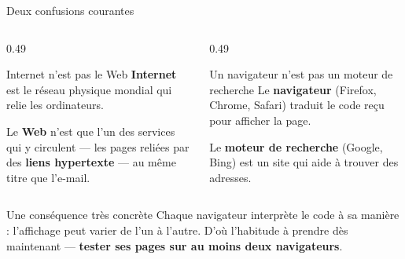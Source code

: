 \documentclass[aspectratio=169,11pt]{beamer}
\begin{document}
\begin{frame}{Deux confusions courantes}
  \begin{columns}[T]
    \begin{column}{0.49\textwidth}
      \begin{alertblock}{Internet n'est pas le Web}
        \textbf{Internet} est le réseau physique mondial qui relie les ordinateurs.
        \vspace{0.15cm}

        Le \textbf{Web} n'est que l'un des services qui y circulent --- les pages reliées par des \textbf{liens hypertexte} --- au même titre que l'e-mail.
      \end{alertblock}
    \end{column}
    \begin{column}{0.49\textwidth}
      \begin{alertblock}{Un navigateur n'est pas un moteur de recherche}
        Le \textbf{navigateur} (Firefox, Chrome, Safari) traduit le code reçu pour afficher la page.
        \vspace{0.15cm}

        Le \textbf{moteur de recherche} (Google, Bing) est un site qui aide à trouver des adresses.
      \end{alertblock}
    \end{column}
  \end{columns}
  \vspace{0.3cm}
  \begin{block}{Une conséquence très concrète}
    Chaque navigateur interprète le code à sa manière : l'affichage peut varier de l'un à l'autre. D'où l'habitude à prendre dès maintenant --- \textbf{tester ses pages sur au moins deux navigateurs}.
  \end{block}
\end{frame}
\end{document}
